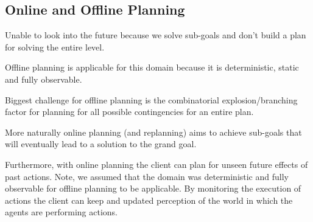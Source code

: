 \subsection{Online and Offline Planning}

Unable to look into the future because we solve sub-goals and don't build a plan for solving the entire level.

Offline planning is applicable for this domain because it is deterministic, static and fully observable.

Biggest challenge for offline planning is the combinatorial explosion/branching factor for planning for all possible contingencies for an entire plan.

More naturally online planning (and replanning) aims to achieve sub-goals that will eventually lead to a solution to the grand goal.

Furthermore, with online planning the client can plan for unseen future effects of past actions.
Note, we assumed that the domain was deterministic and fully observable for offline planning to be applicable.
By monitoring the execution of actions the client can keep and updated perception of the world in which the agents are performing actions.

